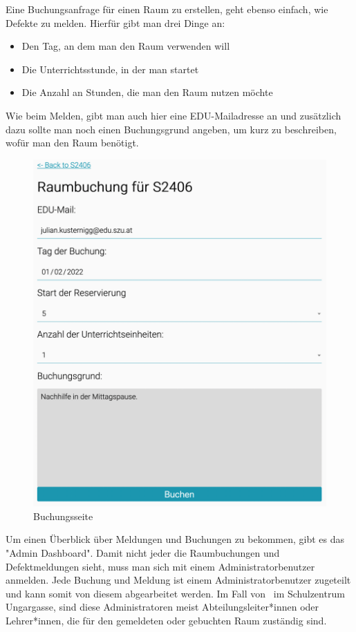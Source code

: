 Eine Buchungsanfrage für einen Raum zu erstellen, geht ebenso einfach, wie Defekte zu melden. Hierfür gibt man drei Dinge an: 
\begin{itemize}
    \item Den Tag, an dem man den Raum verwenden will
    \item Die Unterrichtsstunde, in der man startet
    \item Die Anzahl an Stunden, die man den Raum nutzen möchte
\end{itemize} 
Wie beim Melden, gibt man auch hier eine EDU-Mailadresse an und zusätzlich dazu sollte man noch einen Buchungsgrund angeben, um kurz zu beschreiben, wofür man den Raum benötigt.

\begin{figure}[H]
    \centering
    \includegraphics[width=120mm]{media/WebComponents/Buchungsseite_light.png}
    \caption{Buchungsseite}
\end{figure}


\label{sec:webcomplogdash}

Um einen Überblick über Meldungen und Buchungen zu bekommen, gibt es das "Admin Dashboard". Damit nicht jeder die Raumbuchungen und Defektmeldungen sieht, muss man sich mit einem Administratorbenutzer anmelden. Jede Buchung und Meldung ist einem Administratorbenutzer zugeteilt und kann somit von diesem abgearbeitet werden. Im Fall von \ZELIA\ im Schulzentrum Ungargasse, sind diese Administratoren meist Abteilungsleiter*innen oder Lehrer*innen, die für den gemeldeten oder gebuchten Raum zuständig sind. 

